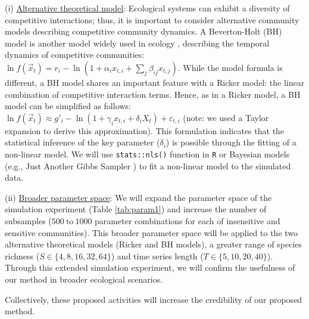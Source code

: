 \documentclass[12pt, class=article, crop=false]{standalone}
\begin{document}
(i) \ul{Alternative theoretical model}:
Ecological systems can exhibit a diversity of competitive interactions; thus, it is important to consider alternative community models describing competitive community dynamics. 
A Beverton-Holt (BH) model is another model widely used in ecology \citep{otto_biologists_2011}, describing the temporal dynamics of competitive communities: $\ln f(\overset{\rightarrow}{x}_{t}) = r_i - \ln(1 + \alpha_i x_{t,i} + \sum_j \beta_{ij} x_{t,j})$. 
While the model formula is different, a BH model shares an important feature with a Ricker model: the linear combination of competitive interaction terms.
Hence, as in a Ricker model, a BH model can be simplified as follows: $\ln f(\overset{\rightarrow}{x}_{t}) \approx g'_{i} - \ln(1 + \gamma_i x_{t,i} + \delta_i X_t) + \varepsilon_{t,i}$ (note: we used a Taylor expansion to derive this approximation).
This formulation indicates that the statistical inference of the key parameter ($\delta_i$) is possible through the fitting of a non-linear model.
We will use \texttt{stats::nls()} function in \texttt{R} or Bayesian models (e.g., Just Another Gibbs Sampler \citep{plummer_jags_2003}) to fit a non-linear model to the simulated data.

(ii) \ul{Broader parameter space}: We will expand the parameter space of the simulation experiment (Table \ref{tab:param1}) and increase the number of subsamples ($500~\mbox{to}~1000$ parameter combinations for each of insensitive and sensitive communities).
This broader parameter space will be applied to the two alternative theoretical models (Ricker and BH models), a greater range of species richness ($S \in \{4, 8, 16, 32, 64\}$) and time series length ($T \in \{5, 10, 20, 40\}$).
Through this extended simulation experiment,  we will confirm the usefulness of our method in broader ecological scenarios.

Collectively, these proposed activities will increase the credibility of our proposed method.
\end{document}
